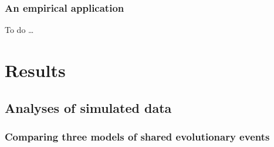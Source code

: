\documentclass[letterpaper,12pt]{article}
\begin{document}
\subsubsection{An empirical application}

To do \ldots

\section{Results}

\subsection{Analyses of simulated data}

\subsubsection{Comparing three models of shared evolutionary events}
\end{document}
